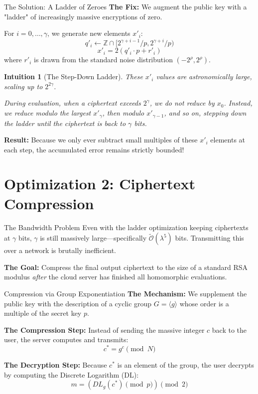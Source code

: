 \documentclass[10pt, aspectratio=169]{beamer}
\newtheorem{intuition}{Intuition}
\begin{document}
\begin{frame}{The Solution: A Ladder of Zeroes}
    \textbf{The Fix:} We augment the public key with a "ladder" of increasingly massive encryptions of zero.
    \pause
    
    \vspace{0.2cm}
    For $i = 0, \dots, \gamma$, we generate new elements $x'_i$:
    $$q'_i \leftarrow \mathbb{Z} \cap [2^{\gamma+i-1}/p, 2^{\gamma+i}/p)$$
    $$x'_i = 2(q'_i \cdot p + r'_i)$$
    where $r'_i$ is drawn from the standard noise distribution $(-2^\rho, 2^\rho)$.
    \pause
    
    \vspace{0.3cm}
    \begin{intuition}[The Step-Down Ladder]
    These $x'_i$ values are astronomically large, scaling up to $2^{2\gamma}$. 
    
    During evaluation, when a ciphertext exceeds $2^\gamma$, we do not reduce by $x_0$. Instead, we reduce modulo the largest $x'_\gamma$, then modulo $x'_{\gamma-1}$, and so on, stepping down the ladder until the ciphertext is back to $\gamma$ bits.
    \end{intuition}
    \pause
    
    \textbf{Result:} Because we only ever subtract small multiples of these $x'_i$ elements at each step, the accumulated error remains strictly bounded!
\end{frame}

\section{Optimization 2: Ciphertext Compression}
\begin{frame}{The Bandwidth Problem}
    Even with the ladder optimization keeping ciphertexts at $\gamma$ bits, $\gamma$ is still massively large—specifically $\tilde{\mathcal{O}}(\lambda^5)$ bits. Transmitting this over a network is brutally inefficient.
    \pause
    
    \vspace{0.3cm}
    \textbf{The Goal:} Compress the final output ciphertext to the size of a standard RSA modulus \textit{after} the cloud server has finished all homomorphic evaluations.
\end{frame}

\begin{frame}{Compression via Group Exponentiation}
    \textbf{The Mechanism:}
    We supplement the public key with the description of a cyclic group $G = \langle g \rangle$ whose order is a multiple of the secret key $p$.
    \pause
    
    \vspace{0.3cm}
    \textbf{The Compression Step:}
    Instead of sending the massive integer $c$ back to the user, the server computes and transmits:
    $$c^* = g^c \pmod N$$
    \pause
    
    \vspace{0.3cm}
    \textbf{The Decryption Step:}
    Because $c^*$ is an element of the group, the user decrypts by computing the Discrete Logarithm (DL):
    $$m = \left( DL_g(c^*) \pmod p \right) \pmod 2$$
\end{frame}
\end{document}
